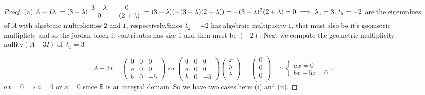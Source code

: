 \documentclass[addpoints,10pt]{exam}
\theoremstyle{plain}
\theoremstyle{definition}
\theoremstyle{plain}
\theoremstyle{plain}
\theoremstyle{definition}
\newcommand{\RR}{\ensuremath{\mathbb{R}}}
\begin{document}
\begin{proof}
(a)$|A-I\lambda|= (3-\lambda)\begin{vmatrix}
3-\lambda & 0\\
0 & -(2+\lambda)
\end{vmatrix}=(3-\lambda)(-(3-\lambda)(2+\lambda))=-(3-\lambda)^{2}(2+\lambda)=0\newline \implies \lambda_{1}=3,\lambda_{2}=-2$ are the eigenvalues of $A$ with algebraic multiplicities $2$ and $1$, respectively.Since $\lambda_{2}=-2$ has algebraic multiplicity $1$, that must also be it's geometric multiplicty and so the jordan block it contributes has size $1$ and then must be $(-2)$. Next we compute the geometric multiplicity $\mathrm{nullity}(A-3I)$ of $\lambda_{1}=3$.

\[
A-3I=
\begin{pmatrix}
0 & 0 & 0\\
a & 0 & 0\\
b & 0 & -5
\end{pmatrix}\text{ so }\begin{pmatrix}
0 & 0 & 0\\
a & 0 & 0\\
b & 0 & -5
\end{pmatrix}\begin{pmatrix}
x \\
y \\
z \\
\end{pmatrix}=\begin{pmatrix}
0 \\
0 \\
0 \\
\end{pmatrix}\implies \begin{cases}
  ax=0\\
  bx-5z=0
\end{cases}.
\]
$ax=0\implies a=0$ or $x=0$ since $\RR$ is an integral domain. So we have two cases here: (i) and (ii).


\end{proof}
\end{document}
